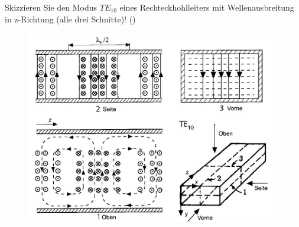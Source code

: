 \begin{question}[section=,name={},difficulty=,quantity=,type=thr,tags={20151210}]
	Skizzieren Sie den Modus $TE_{10}$ eines Rechteckhohlleiters mit Wellenausbreitung in z-Richtung (alle drei Schnitte)! ()
	
	
\end{question}
\begin{solution}
	\begin{figure}[H]
		\includegraphics[width=14cm]{./opn/exm/thr/chp/6/2/bild.jpeg}
	\end{figure}
\end{solution}